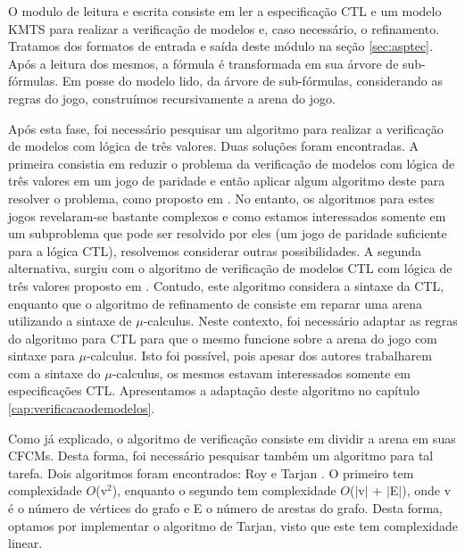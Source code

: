 \documentclass[normaltoc,capchap,capsec,times]{abnt}
\begin{document}
O modulo de leitura e escrita consiste em ler a especificação CTL e um modelo KMTS para realizar a verificação de modelos e, caso necessário, o refinamento. Tratamos dos formatos de entrada e saída deste módulo na seção \ref{sec:asptec}. Após a leitura dos mesmos, a fórmula é transformada em sua árvore de sub-fórmulas. Em posse do modelo lido, da árvore de sub-fórmulas, considerando as regras do jogo, construímos recursivamente a arena do jogo. 

Após esta fase, foi necessário pesquisar um algoritmo para realizar a verificação de modelos com lógica de três valores. Duas soluções foram encontradas. A primeira consistia em reduzir o problema da verificação de modelos com lógica de três valores em um jogo de paridade e então aplicar algum algoritmo deste para resolver o problema, como proposto em \cite{grumberglosing}. No entanto, os algoritmos para estes jogos revelaram-se bastante complexos e como estamos interessados somente em um subproblema que pode ser resolvido por eles (um jogo de paridade suficiente para a lógica CTL), resolvemos considerar outras possibilidades. A segunda alternativa, surgiu com o algoritmo de verificação de modelos CTL com lógica de três valores proposto em \cite{grumbergalg}. Contudo, este algoritmo considera a sintaxe da CTL, enquanto que o algoritmo de refinamento de \cite{aline} consiste em reparar uma arena utilizando a sintaxe de $\mu$-calculus. Neste contexto, foi necessário adaptar as regras do algoritmo para CTL para que o mesmo funcione sobre a arena do jogo com sintaxe para $\mu$-calculus. Isto foi possível, pois apesar dos autores trabalharem com a sintaxe do $\mu$-calculus, os mesmos estavam interessados somente em especificações CTL. Apresentamos a adaptação deste algoritmo no capítulo \ref{cap:verificacaodemodelos}.

Como já explicado, o algoritmo de verificação consiste em dividir a arena em suas CFCMs. Desta forma, foi necessário pesquisar também um algoritmo para tal tarefa. Dois algoritmos foram encontrados: Roy \cite{grafosRoy} e Tarjan \cite{tarjan}. O primeiro tem complexidade $O$(v$^2$), enquanto o segundo tem complexidade $O$($\vert$v$\vert$ + $\vert$E$\vert$), onde v é o número de vértices do grafo e E o número de arestas do grafo. Desta forma, optamos por implementar o algoritmo de Tarjan, visto que este tem complexidade linear.
\end{document}

